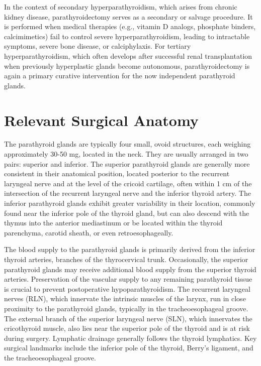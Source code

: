In the context of secondary hyperparathyroidism, which arises from chronic kidney disease, parathyroidectomy serves as a secondary or salvage procedure. It is performed when medical therapies (e.g., vitamin D analogs, phosphate binders, calcimimetics) fail to control severe hyperparathyroidism, leading to intractable symptoms, severe bone disease, or calciphylaxis. For tertiary hyperparathyroidism, which often develops after successful renal transplantation when previously hyperplastic glands become autonomous, parathyroidectomy is again a primary curative intervention for the now independent parathyroid glands.

\section*{Relevant Surgical Anatomy}
The parathyroid glands are typically four small, ovoid structures, each weighing approximately 30-50 mg, located in the neck. They are usually arranged in two pairs: superior and inferior. The superior parathyroid glands are generally more consistent in their anatomical position, located posterior to the recurrent laryngeal nerve and at the level of the cricoid cartilage, often within 1 cm of the intersection of the recurrent laryngeal nerve and the inferior thyroid artery. The inferior parathyroid glands exhibit greater variability in their location, commonly found near the inferior pole of the thyroid gland, but can also descend with the thymus into the anterior mediastinum or be located within the thyroid parenchyma, carotid sheath, or even retroesophageally. 

The blood supply to the parathyroid glands is primarily derived from the inferior thyroid arteries, branches of the thyrocervical trunk. Occasionally, the superior parathyroid glands may receive additional blood supply from the superior thyroid arteries. Preservation of the vascular supply to any remaining parathyroid tissue is crucial to prevent postoperative hypoparathyroidism. The recurrent laryngeal nerves (RLN), which innervate the intrinsic muscles of the larynx, run in close proximity to the parathyroid glands, typically in the tracheoesophageal groove. The external branch of the superior laryngeal nerve (SLN), which innervates the cricothyroid muscle, also lies near the superior pole of the thyroid and is at risk during surgery. Lymphatic drainage generally follows the thyroid lymphatics. Key surgical landmarks include the inferior pole of the thyroid, Berry's ligament, and the tracheoesophageal groove.

